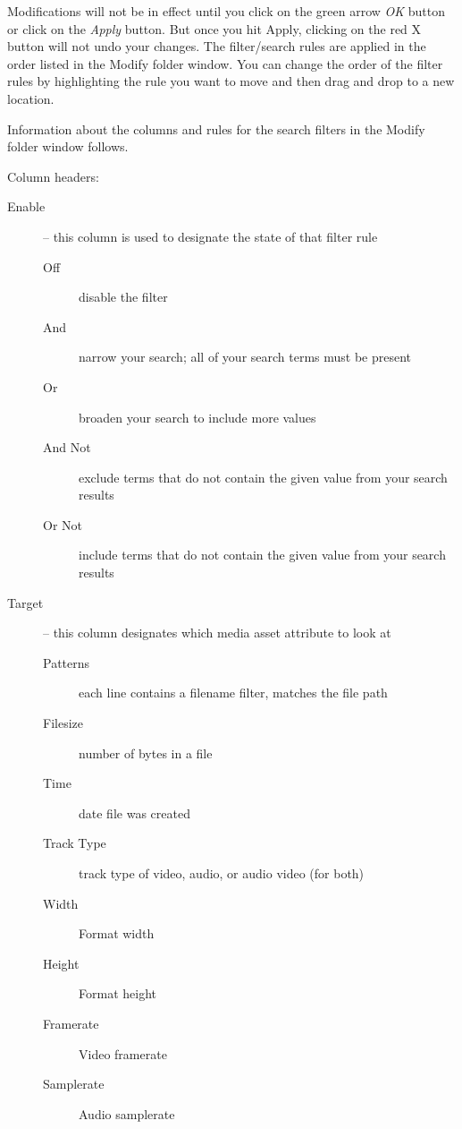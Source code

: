Modifications will not be in effect until you click on the green arrow \textit{OK} button or click on the \textit{Apply} button.  
But once you hit Apply, clicking on the red X button will not undo your changes.  
The filter/search rules are applied in the order listed in the Modify folder window.  
You can change the order of the filter rules by highlighting the rule you want to move and then drag and drop to a new location.

Information about the columns and rules for the search filters in the Modify folder window follows. 

Column headers:

\begin{description}
\item[\textcolor{CinBlueText}{Enable}]  – this column is used to designate the state of that filter rule
    \begin{description}
        \item[Off]		disable the filter
                \item[And] 		narrow your search; all of your search terms must be present
                \item[Or]		broaden your search to include more values
                \item[And Not]	exclude terms that do not contain the given value from your search results
                \item[Or Not]	include terms that do not contain the given value from your search results
    \end{description}
\item [\textcolor{CinBlueText}{Target}] – this column designates which media asset attribute to look at
    \begin{description}
        \item[Patterns]	each line contains a filename filter, matches the file path
                \item[Filesize]	number of bytes in a file
                \item[Time]		date file was created
                \item[Track Type]	track type of video, audio, or audio video (for both)
                \item[Width]	Format width
                \item[Height]	Format height
                \item[Framerate]	Video framerate
                \item[Samplerate]	Audio samplerate

\end{description}
\end{description}
